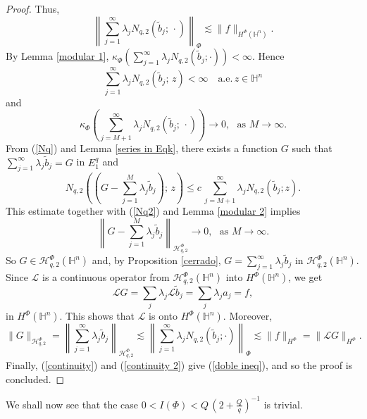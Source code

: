 \documentclass[oneside,10pt]{article}
\begin{document}
\begin{proof}
Thus,
\[
\left\| \sum_{j=1}^{\infty} \lambda_j N_{q, 2} \left( \widetilde{b}_j; \, \cdot \right) \right\|_{\Phi} \lesssim 
\|f \|_{{H^{\Phi}(\mathbb{H}^n)}}.
\]
By Lemma \ref{modular 1}, $\kappa_{\Phi}\left( \sum_{j=1}^{\infty} \lambda_j N_{q, 2}(\widetilde{b}_j; \cdot) \right) < \infty$. Hence
\begin{equation}
\sum_{j=1}^{\infty} \lambda_j N_{q, 2}(\widetilde{b}_j; \, z) < \infty \,\,\,\,\,\, \text{a.e.} \, z \in \mathbb{H}^{n} \label{Nq}
\end{equation}
and
\begin{equation}
\kappa_{\Phi}\left( \sum_{j=M+1}^{\infty} \lambda_j N_{q, 2}(\widetilde{b}_j; \, \cdot) \right) \rightarrow 0, \,\,\,\, \text{as} \,\,  M \rightarrow \infty  \label{Nq2}.
\end{equation}
From (\ref{Nq}) and Lemma \ref{series in Eqk}, there exists a function $G$ such that $\sum_{j=1}^{\infty} \lambda_j \widetilde{b}_j = G$ 
in $E^{q}_{1}$ and
\[
N_{q, 2} \left( \left(G - \sum_{j=1}^{M} \lambda_j \widetilde{b}_j \right) ; \, z \right) \leq c \, 
\sum_{j=M+1}^{\infty} \lambda_j N_{q, 2}(\widetilde{b}_j; z).
\]
This estimate together with (\ref{Nq2}) and Lemma \ref{modular 2} implies
\[
\left\| G - \sum_{j=1}^{M} \lambda_j \widetilde{b}_j \right\|_{\mathcal{H}^{\Phi}_{q,2}} \rightarrow 0, \,\,\,\, \text{as} \,\,  M \rightarrow \infty.
\]
So $G \in \mathcal{H}^{\Phi}_{q,2}(\mathbb{H}^{n})$ and, by Proposition \ref{cerrado}, $G = \sum_{j=1}^{\infty} \lambda_j \widetilde{b}_j$ 
in $\mathcal{H}^{\Phi}_{q,2}(\mathbb{H}^{n})$. Since $\mathcal{L}$ is a continuous operator from $\mathcal{H}^{\Phi}_{q,2}(\mathbb{H}^{n})$ into $H^{\Phi}(\mathbb{H}^{n})$, we get
\[
\mathcal{L}G = \sum_j \lambda_j \mathcal{L} \widetilde{b}_j = \sum_j \lambda_j a_j = f,
\]
in $H^{\Phi}(\mathbb{H}^{n})$. This shows that $\mathcal{L}$ is onto $H^{\Phi}(\mathbb{H}^{n})$. Moreover,
\begin{equation} \label{continuity 2}
\| G\|_{\mathcal{H}^{\Phi}_{q,2}} = \left\| \sum_{j=1}^{\infty} \lambda_j \widetilde{b}_j \right\|_{\mathcal{H}^{\Phi}_{q,2}} \lesssim 
\left\| \sum_{j=1}^{\infty} \lambda_j N_{q, 2}(\widetilde{b}_j; \cdot) \right\|_{\Phi} \lesssim \|f \|_{H^{\Phi}} = 
\| \mathcal{L} G \|_{H^{\Phi}}.
\end{equation}
Finally, (\ref{continuity}) and (\ref{continuity 2}) give (\ref{doble ineq}), and so the proof is concluded.
\end{proof}

We shall now see that the case $0 < I(\Phi) < Q \, (2 + \frac{Q}{q})^{-1}$ is trivial.
\end{document}
